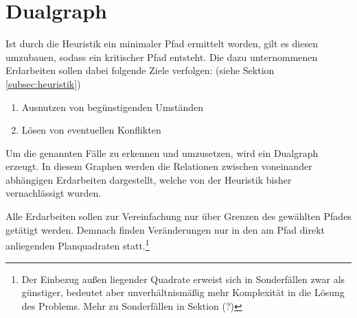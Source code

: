 \documentclass[a4paper, 12pt]{scrartcl}
\begin{document}
\section{Dualgraph}
Ist durch die Heuristik ein minimaler Pfad ermittelt worden, gilt es diesen umzubauen, sodass ein kritischer Pfad entsteht. Die dazu unternommenen Erdarbeiten sollen dabei folgende Ziele verfolgen: (siehe Sektion \ref{subsec:heuristik})
\begin{enumerate}
	\item Ausnutzen von begünstigenden Umständen
	\item Lösen von eventuellen Konflikten
\end{enumerate}
Um die genannten Fälle zu erkennen und umzusetzen, wird ein Dualgraph erzeugt. In diesem Graphen werden die Relationen zwischen voneinander abhängigen Erdarbeiten dargestellt, welche von der Heuristik bisher vernachlässigt wurden.

Alle Erdarbeiten sollen zur Vereinfachung nur über Grenzen des gewählten Pfades getätigt werden. Demnach finden Veränderungen nur in den am Pfad direkt anliegenden Planquadraten statt.\footnote{Der Einbezug außen liegender Quadrate erweist sich in Sonderfällen zwar als günstiger, bedeutet aber unverhältnismäßig mehr Komplexität in die Lösung des Problems. Mehr zu Sonderfällen in Sektion (?)} %
\end{document}
